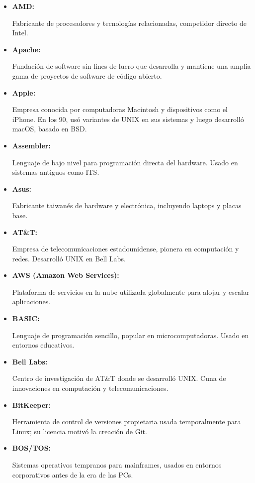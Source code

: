 \documentclass[a4paper,12pt]{article}
\begin{document}
\begin{itemize} \item \hypertarget{amd}{\textbf{AMD:}} Fabricante de
procesadores y tecnologías relacionadas, competidor directo de Intel.
\label{amd}

\item \hypertarget{apache}{\textbf{Apache:}} Fundación de software sin fines de
lucro que desarrolla y mantiene una amplia gama de proyectos de software de
código abierto.

\item \hypertarget{apple}{\textbf{Apple:}} Empresa conocida por computadoras
Macintosh y dispositivos como el iPhone. En los 90, usó variantes de UNIX en sus
sistemas y luego desarrolló macOS, basado en BSD.  \label{apple}

\item \hypertarget{assembler}{\textbf{Assembler:}} Lenguaje de bajo nivel para
programación directa del hardware. Usado en sistemas antiguos como ITS.
\label{assembler}

\item \hypertarget{asus}{\textbf{Asus:}} Fabricante taiwanés de hardware y
electrónica, incluyendo laptops y placas base.  \label{asus}

\item \hypertarget{att}{\textbf{AT\&T:}} Empresa de telecomunicaciones
estadounidense, pionera en computación y redes. Desarrolló UNIX en Bell Labs.
\label{att}

\item \hypertarget{aws}{\textbf{AWS (Amazon Web Services):}} Plataforma de
servicios en la nube utilizada globalmente para alojar y escalar aplicaciones.
\label{aws}

\item \hypertarget{basic}{\textbf{BASIC:}} Lenguaje de programación sencillo,
popular en microcomputadoras. Usado en entornos educativos.  \label{basic}

\item \hypertarget{belllabs}{\textbf{Bell Labs:}} Centro de investigación de
AT\&T donde se desarrolló UNIX. Cuna de innovaciones en computación y
telecomunicaciones.  \label{belllabs}

\item \hypertarget{bitkeeper}{\textbf{BitKeeper:}} Herramienta de control de
versiones propietaria usada temporalmente para Linux; su licencia motivó la
creación de Git.  \label{bitkeeper}

\item \hypertarget{bostos}{\textbf{BOS/TOS:}} Sistemas operativos tempranos para
mainframes, usados en entornos corporativos antes de la era de las PCs.
\label{bostos}


\end{itemize}
\end{document}
